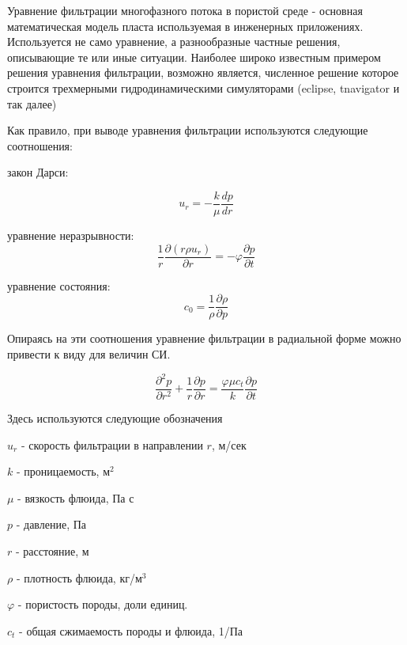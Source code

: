 
Уравнение фильтрации многофазного потока в пористой среде - основная математическая модель пласта используемая в инженерных приложениях. Используется не само уравнение, а разнообразные частные решения, описывающие те или иные ситуации. Наиболее широко известным примером решения уравнения фильтрации, возможно является, численное решение которое строится трехмерными гидродинамическими симуляторами (eclipse, tnavigator и так далее)


Как правило, при выводе уравнения фильтрации используются следующие соотношения:

закон Дарси:  

\begin{equation} \label{eq:darcy_law_1}
	u_r=-\frac{k}{\mu}\frac{dp}{dr} 
\end{equation}

уравнение неразрывности: 
\begin{equation} \label{eq:mass_balance_1} 
	\frac{1}{r}\frac{\partial\left(r\rho u_r\right)}{\partial r}=-\varphi\frac{\partial p}{\partial t} 
\end{equation}

уравнение состояния: 
\begin{equation} \label{eq:eos_1} 
	c_0=\frac{1}{\rho}\frac{\partial\rho}{\partial p} 
\end{equation}

Опираясь на эти соотношения уравнение фильтрации в радиальной форме можно привести к виду для величин СИ.

\begin{equation} \label{eq:diff_eq_1} 
	\frac{\partial ^2 p }{\partial r^2} + \frac{1}{r} \frac{\partial p}{\partial r} = \frac{\varphi \mu c_t}{k} \frac{\partial p}{\partial t} 
\end{equation}

Здесь используются следующие обозначения

$u_r$ - скорость фильтрации в направлении $r$, м/сек

$k$ - проницаемость, м$^2$

$\mu$ - вязкость флюида, Па с

$p$ - давление, Па 

$r$ - расстояние, м 

$\rho$ - плотность флюида, кг/м$^3$

$\varphi$ - пористость породы, доли единиц.

$c_t$ - общая сжимаемость породы и флюида, 1/Па

